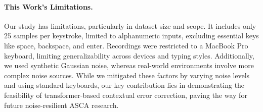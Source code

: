 \paragraph{This Work's Limitations.}
Our study has limitations, particularly in dataset size and scope. It includes only 25 samples per keystroke, limited to alphanumeric inputs, excluding essential keys like space, backspace, and enter. Recordings were restricted to a MacBook Pro keyboard, limiting generalizability across devices and typing styles. Additionally, we used synthetic Gaussian noise, whereas real-world environments involve more complex noise sources. While we mitigated these factors by varying noise levels and using standard keyboards, our key contribution lies in demonstrating the feasibility of transformer-based contextual error correction, paving the way for future noise-resilient ASCA research.

